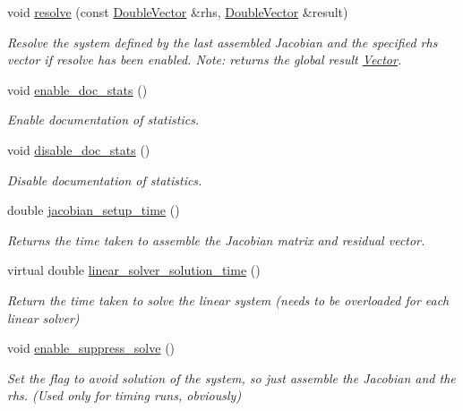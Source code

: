 \begin{DoxyCompactItemize}
void \hyperlink{classoomph_1_1MumpsSolver_a849d13cac2177452446c2ec387a0260f}{resolve} (const \hyperlink{classoomph_1_1DoubleVector}{Double\+Vector} \&rhs, \hyperlink{classoomph_1_1DoubleVector}{Double\+Vector} \&result)
\begin{DoxyCompactList}\small\item\em Resolve the system defined by the last assembled Jacobian and the specified rhs vector if resolve has been enabled. Note\+: returns the global result \hyperlink{classoomph_1_1Vector}{Vector}. \end{DoxyCompactList}\item 
void \hyperlink{classoomph_1_1MumpsSolver_a25426798eb831cf552bdc17c0307ff25}{enable\+\_\+doc\+\_\+stats} ()
\begin{DoxyCompactList}\small\item\em Enable documentation of statistics. \end{DoxyCompactList}\item 
void \hyperlink{classoomph_1_1MumpsSolver_a8f64fcf52cb7cbf89b75da1d794dee5f}{disable\+\_\+doc\+\_\+stats} ()
\begin{DoxyCompactList}\small\item\em Disable documentation of statistics. \end{DoxyCompactList}\item 
double \hyperlink{classoomph_1_1MumpsSolver_aea9e3eead627f8f8963f7b5c70b669f7}{jacobian\+\_\+setup\+\_\+time} ()
\begin{DoxyCompactList}\small\item\em Returns the time taken to assemble the Jacobian matrix and residual vector. \end{DoxyCompactList}\item 
virtual double \hyperlink{classoomph_1_1MumpsSolver_a52e765662a0e2cbd81dc5dc280905604}{linear\+\_\+solver\+\_\+solution\+\_\+time} ()
\begin{DoxyCompactList}\small\item\em Return the time taken to solve the linear system (needs to be overloaded for each linear solver) \end{DoxyCompactList}\item 
void \hyperlink{classoomph_1_1MumpsSolver_ab5d49803e13ef6e6026e470a9933613e}{enable\+\_\+suppress\+\_\+solve} ()
\begin{DoxyCompactList}\small\item\em Set the flag to avoid solution of the system, so just assemble the Jacobian and the rhs. (Used only for timing runs, obviously) \end{DoxyCompactList}\item 

\end{DoxyCompactItemize}
